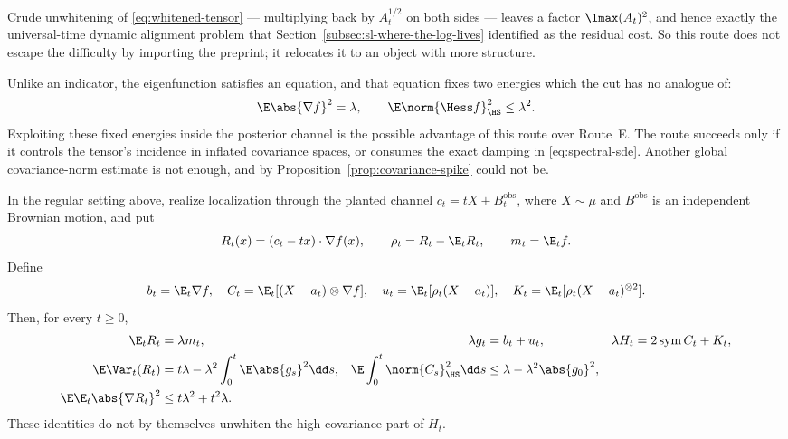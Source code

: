 \documentclass[../../main.tex]{subfiles}
\begin{document}
Crude unwhitening of \eqref{eq:whitened-tensor} --- multiplying back by $A_t^{1/2}$ on both sides
--- leaves a factor $\lmax(A_t)^2$, and hence exactly the universal-time dynamic alignment
problem that Section~\ref{subsec:sl-where-the-log-lives} identified as the residual cost. So this
route does not escape the difficulty by importing the preprint; it relocates it to an object with
more structure.

\begin{remark}
\label{rem:spectral-extra-structure}
Unlike an indicator, the eigenfunction satisfies an equation, and that equation fixes two energies
which the cut has no analogue of:
\[
  \E\abs{\nabla f}^2=\lambda,
  \qquad
  \E\norm{\Hess f}_{\HS}^2\le\lambda^2 .
\]
Exploiting these fixed energies inside the posterior channel is the possible advantage of this
route over Route~E. The route succeeds only if it controls the tensor's incidence in inflated
covariance spaces, or consumes the exact damping in \eqref{eq:spectral-sde}. Another global
covariance-norm estimate is not enough, and by Proposition~\ref{prop:covariance-spike} could not
be.
\end{remark}

\begin{lemma}
\label{lem:mm-posterior-defect}
In the regular setting above, realize localization through the planted channel
$c_t=tX+B_t^{\mathrm{obs}}$, where $X\sim\mu$ and $B^{\mathrm{obs}}$ is an independent Brownian
motion, and put
\[
  R_t(x)=(c_t-tx)\cdot\nabla f(x),
  \qquad \rho_t=R_t-\E_tR_t,
  \qquad m_t=\E_tf.
\]
Define
\[
  b_t=\E_t\nabla f,
  \quad C_t=\E_t[(X-a_t)\otimes\nabla f],
  \quad u_t=\E_t[\rho_t(X-a_t)],
  \quad K_t=\E_t[\rho_t(X-a_t)^{\otimes2}].
\]
Then, for every $t\ge0$,
\begin{align}
  \E_tR_t&=\lambda m_t,
  &\lambda g_t&=b_t+u_t,
  &\lambda H_t&=2\operatorname{sym}C_t+K_t,
  \label{eq:mm-posterior-defect-identities}\\
  \E\Var_t(R_t)
  &=t\lambda-\lambda^2\int_0^t\E\abs{g_s}^2\dd s,
  &\E\int_0^t\norm{C_s}_{\HS}^2\dd s
  &\le\lambda-\lambda^2\abs{g_0}^2,
  \label{eq:mm-posterior-defect-budgets}\\
  \E\E_t\abs{\nabla R_t}^2
  &\le t\lambda^2+t^2\lambda.
  \label{eq:mm-posterior-defect-gradient}
\end{align}
These identities do not by themselves unwhiten the high-covariance part of $H_t$.
\end{lemma}
\end{document}
